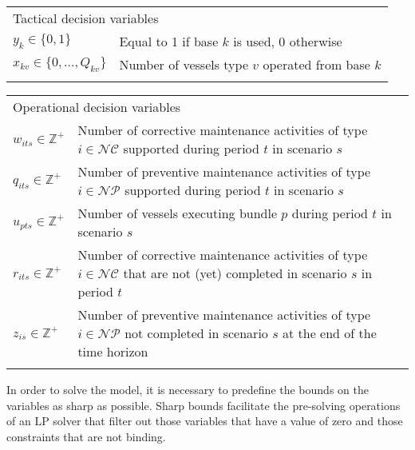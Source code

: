 \begin{tabular}{ll}
	\\
	\multicolumn{2}{l}{Tactical decision variables}\\
	$y_{k} \in \{0,1\}$ 	& Equal to 1 if base $k$ is used, 0 otherwise\\
	$x_{kv} \in\{0,\ldots,Q_{kv}\}$ &	Number of vessels type $v$ operated from base $k$\\
	\\
\end{tabular}	

\begin{tabular}{ll}	
	\multicolumn{2}{l}{Operational decision variables}\\

	$w_{its}\in\mathbb{Z}^+$	&	\parbox[t]{10cm}{Number of corrective maintenance activities of type  $i \in\mathcal{NC}$ supported during period $t$ in scenario $s$}\\
	$q_{its} \in\mathbb{Z}^+$	&	\parbox[t]{10cm}{Number of preventive maintenance activities of type $i \in \mathcal{NP}$ supported during period $t$ in scenario $s$}\\
	$u_{pts}\in\mathbb{Z}^+$ &	\parbox[t]{10cm}{Number of vessels executing bundle $p$ during period $t$ in scenario $s$}\\
	$r_{its}\in\mathbb{Z}^+$	&	\parbox[t]{10cm}{Number of corrective maintenance activities of type  $i \in\mathcal{NC}$ that are not (yet) completed in scenario $s$ in period $t$}\\
	$z_{i s}\in\mathbb{Z}^+$	&	\parbox[t]{10cm}{Number of preventive maintenance activities of type $i \in \mathcal{NP}$ not completed in scenario $s$ at the end of the time horizon}\\
								\\	
\end{tabular}

In order to solve the model, it is necessary to predefine the bounds on the variables as sharp as possible. Sharp bounds facilitate the pre-solving operations of an LP solver that filter out those variables that have a value of zero and those constraints that are not binding.


